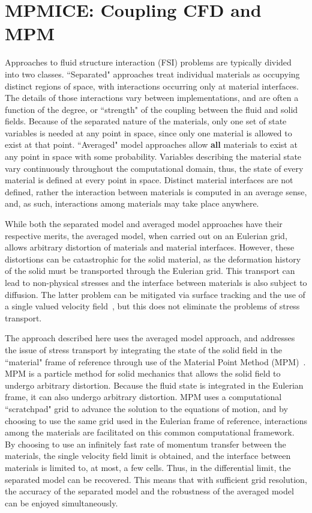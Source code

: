\chapter{MPMICE: Coupling CFD and MPM} \label{ch:MPMICE}
Approaches to fluid structure interaction (FSI) problems are typically
divided into two classes.  ``Separated" approaches treat individual materials
as occupying distinct regions of space, with interactions occurring only at
material interfaces.  The details of those interactions vary between
implementations, and are often a function of the degree, or ``strength" of the
coupling between the fluid and solid fields.  Because of the separated
nature of the materials, only one set of state variables is needed at any
point in space, since only one material is allowed to exist at that point.
``Averaged" model approaches allow {\bf all} materials to exist at any point in
space with some probability.    Variables describing the material state vary 
continuously throughout the computational domain, thus, the state of every 
material is defined at every point in space.  Distinct material interfaces are 
not defined, rather the interaction between materials is computed in an average 
sense, and, as such, interactions among materials may take place anywhere.

While both the separated model and averaged model approaches have their
respective merits, the averaged model, when carried out on an Eulerian grid,
allows arbitrary distortion of materials and material 
interfaces.  However, these distortions can be catastrophic for the solid 
material, as the deformation history of the solid must be transported through 
the Eulerian grid.  This transport can lead to non-physical stresses and the 
interface between materials is also subject to diffusion.  The latter problem 
can be mitigated via surface tracking and the use of a single valued 
velocity field~\cite{Benson1995,Benson1998}, but this does not eliminate the 
problems of stress transport.

The approach described here uses the averaged model approach, and addresses
the issue of stress transport by integrating the state of the solid field in 
the ``material" frame of reference through use of the Material Point 
Method (MPM)~\cite{Sulsky1994,Sulsky1995}.  MPM is a particle method for 
solid mechanics that allows the solid field to undergo arbitrary 
distortion.  Because the fluid state is integrated in the Eulerian frame, it 
can also undergo arbitrary distortion.  MPM uses a computational ``scratchpad" 
grid to advance the solution to the equations of motion, and by choosing to 
use the same grid used in the Eulerian frame of reference, interactions 
among the materials are facilitated on this common computational 
framework.  By choosing to use an infinitely fast rate of momentum transfer 
between the materials, the single velocity field limit is obtained, and the 
interface between materials is limited to, at most, a few cells.  Thus, in 
the differential limit, the separated model can be recovered.  This means 
that with sufficient grid resolution, the accuracy of the separated model 
and the robustness of the averaged model can be enjoyed simultaneously.

